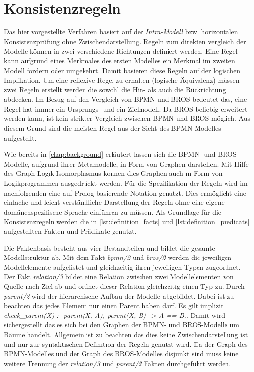 \section{Konsistenzregeln} \label{sec:Konsistenzregeln}

Das hier vorgestellte Verfahren basiert auf der \emph{Intra-Modell} bzw. horizontalen Konsistenzprüfung ohne Zwischendarstellung.
Regeln zum direkten vergleich der Modelle können in zwei verschiedene Richtungen definiert werden.
Eine Regel kann aufgrund eines Merkmales des ersten Modelles ein Merkmal im zweiten Modell fordern oder umgekehrt.
Damit basieren diese Regeln auf der logischen Implikation.
Um eine reflexive Regel zu erhalten (logische Äquivalenz) müssen zwei Regeln erstellt werden die sowohl die Hin- als auch die Rückrichtung abdecken.
Im Bezug auf den Vergleich von BPMN und BROS bedeutet das, eine Regel hat immer ein Ursprungs- und ein Zielmodell.
Da BROS beliebig erweitert werden kann, ist kein strikter Vergleich zwischen BPMN und BROS möglich.
Aus diesem Grund sind die meisten Regel aus der Sicht des BPMN-Modelles aufgestellt.

Wie bereits in \cref{chap:background} erläutert lassen sich die BPMN- und BROS-Modelle, aufgrund ihrer Metamodelle, in Form von Graphen darstellen.
Mit Hilfe des Graph-Logik-Isomorphismus können dies Graphen auch in Form von Logikprogrammen ausgedrückt werden.
Für die Spezifikation der Regeln wird im nachfolgenden eine auf Prolog basierende Notation genutzt.
Dies ermöglicht eine einfache und leicht verständliche Darstellung der Regeln ohne eine eigene domänenspezifische Sprache einführen zu müssen.
Als Grundlage für die Konsistenzregeln werden die in \cref{lst:definition_facts} und \cref{lst:definition_predicats} aufgestellten Fakten und Prädikate genutzt.

Die Faktenbasis besteht aus vier Bestandteilen und bildet die gesamte Modellstruktur ab.
Mit dem Fakt \emph{bpmn/2} und \emph{bros/2} werden die jeweiligen Modellelemente aufgelistet und gleichzeitig ihren jeweiligen Typen zugeordnet.
Der Fakt \emph{relation/3} bildet eine Relation zwischen zwei Modellelementen von Quelle nach Ziel ab und ordnet dieser Relation gleichzeitig einen Typ zu.
Durch \emph{parent/2} wird der hierarchische Aufbau der Modelle abgebildet.
Dabei ist zu beachten das jedes Element nur einen Parent haben darf.
Es gilt implizit \emph{check\_parent(X) :- parent(X, A), parent(X, B) -> A == B.}.
Damit wird sichergestellt das es sich bei den Graphen der BPMN- und BROS-Modelle um Bäume handelt.
Allgemein ist zu beachten das dies keine Zwischendarstellung ist und nur zur syntaktischen Definition der Regeln genutzt wird.
Da der Graph des BPMN-Modelles und der Graph des BROS-Modelles disjunkt sind muss keine weitere Trennung der \emph{relation/3} und \emph{parent/2} Fakten durchgeführt werden.

